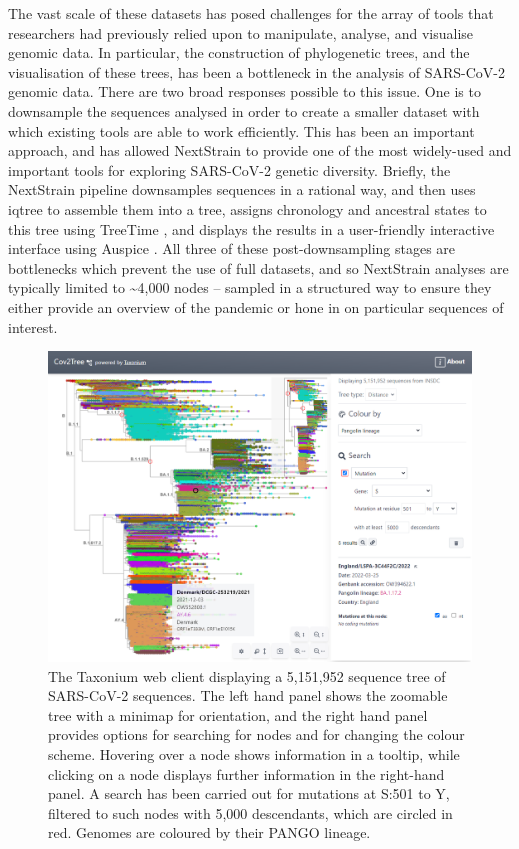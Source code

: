 The vast scale of these datasets has posed challenges for the array of tools that researchers had previously relied upon to manipulate, analyse, and visualise genomic data. In particular, the construction of phylogenetic trees, and the visualisation of these trees, has been a bottleneck in the analysis of SARS-CoV-2 genomic data. There are two broad responses possible to this issue. One is to downsample the sequences analysed in order to create a smaller dataset with which existing tools are able to work efficiently. This has been an important approach, and has allowed NextStrain \citep{nextstrain} to provide one of the most widely-used and important tools for exploring SARS-CoV-2 genetic diversity. Briefly, the NextStrain pipeline downsamples sequences in a rational way, and then uses iqtree \citep{iqtree} to assemble them into a tree, assigns chronology and ancestral states to this tree using TreeTime \citep{treetime}, and displays the results in a user-friendly interactive interface using Auspice \citep{nextstrain}. All three of these post-downsampling stages are bottlenecks which prevent the use of full datasets, and so NextStrain analyses are typically limited to \textasciitilde4,000 nodes -- sampled in a structured way to ensure they either provide an overview of the pandemic or hone in on particular sequences of interest.

\begin{figure}

\begin{center}
\includegraphics[width=\linewidth]{Figures/cov2tree.png}
\end{center}
\caption{The Taxonium web client displaying a 5,151,952 sequence tree of SARS-CoV-2 sequences. The left hand panel shows the zoomable tree with a minimap for orientation, and the right hand panel provides options for searching for nodes and for changing the colour scheme. Hovering over a node shows information in a tooltip, while clicking on a node displays further information in the right-hand panel. A search has been carried out for mutations at S:501 to Y, filtered to such nodes with 5,000 descendants, which are circled in red. Genomes are coloured by their PANGO lineage.}
\label{fig:taxonium_client}
\end{figure}

